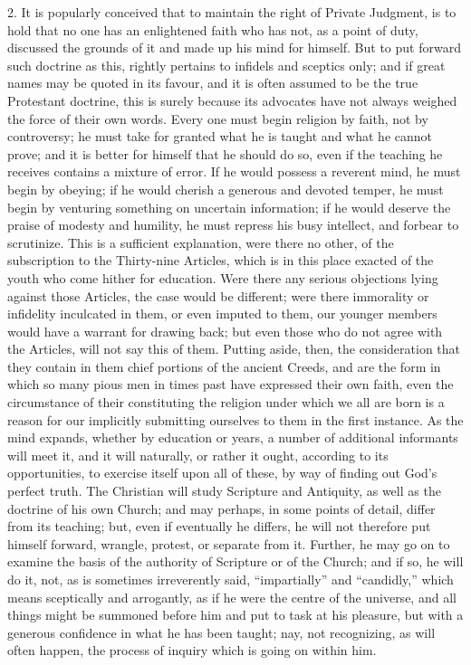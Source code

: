 2. It is popularly conceived that to maintain the right of Private
Judgment, is to hold that no one has an enlightened faith who has not,
as a point of duty, discussed the grounds of it and made up his mind
for himself. But to put forward such doctrine as this, rightly
pertains to infidels and sceptics only; and if great names may be
quoted in its favour, and it is often assumed to be the true
Protestant doctrine, this is surely because its advocates have not
always weighed the force of their own words. Every one must begin
religion by faith, not by controversy; he must take for granted what
he is taught and what he cannot prove; and it is better for himself
that he should do so, even if the teaching he receives contains a
mixture of error. If he would possess a reverent mind, he must
begin by obeying; if he would cherish a generous and devoted temper,
he must begin by venturing something on uncertain information; if he
would deserve the praise of modesty and humility, he must repress his
busy intellect, and forbear to scrutinize. This is a sufficient
explanation, were there no other, of the subscription to the
Thirty-nine Articles, which is in this place exacted of the youth who
come hither for education. Were there any serious objections lying
against those Articles, the case would be different; were there
immorality or infidelity inculcated in them, or even imputed to them,
our younger members would have a warrant for drawing back; but even
those who do not agree with the Articles, will not say this of them.
Putting aside, then, the consideration that they contain in them chief
portions of the ancient Creeds, and are the form in which so many
pious men in times past have expressed their own faith, even the
circumstance of their constituting the religion under which we all are
born is a reason for our implicitly submitting ourselves to them in
the first instance. As the mind expands, whether by education or
years, a number of additional informants will meet it, and it will
naturally, or rather it ought, according to its opportunities, to
exercise itself upon all of these, by way of finding out God's perfect
truth. The Christian will study Scripture and Antiquity, as well as
the doctrine of his own Church; and may perhaps, in some points of
detail, differ from its teaching; but, even if eventually he differs,
he will not therefore put himself forward, wrangle, protest, or
separate from it. Further, he may go on to examine the basis of the
authority of Scripture or of the Church; and if so, he will do it,
not, as is sometimes irreverently said, ``impartially'' and
``candidly,'' which means sceptically and arrogantly, as if he
were the centre of the universe, and all things might be summoned
before him and put to task at his pleasure, but with a generous
confidence in what he has been taught; nay, not recognizing, as will
often happen, the process of inquiry which is going on within him.

